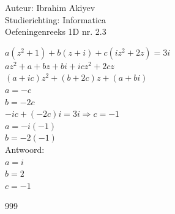 \documentclass[a4paper]{article}
\begin{document}
\noindent \large Auteur: Ibrahim Akiyev \\
\noindent \large Studierichting: Informatica\\
\noindent \large Oefeningenreeks 1D nr. 2.3\\

\medskip

\normalsize

$a(z^2+1) + b(z+i) +c(iz^2+2z) = 3i$\\

$az^2 + a + bz + bi + icz^2 +2cz$\\

$(a+ic)z^2 + (b+2c)z + (a+bi)$\\

$a = -c$\\

$b = -2c$\\

$-ic + (-2c)i = 3i	\Rightarrow c=-1$\\

$a = -i(-1)$\\

$b = -2(-1)$\\

Antwoord:\\

$a=i$\\

$b=2$\\

$c=-1$\\





\begin{thebibliography}{999}
\end{thebibliography}
\end{document}
